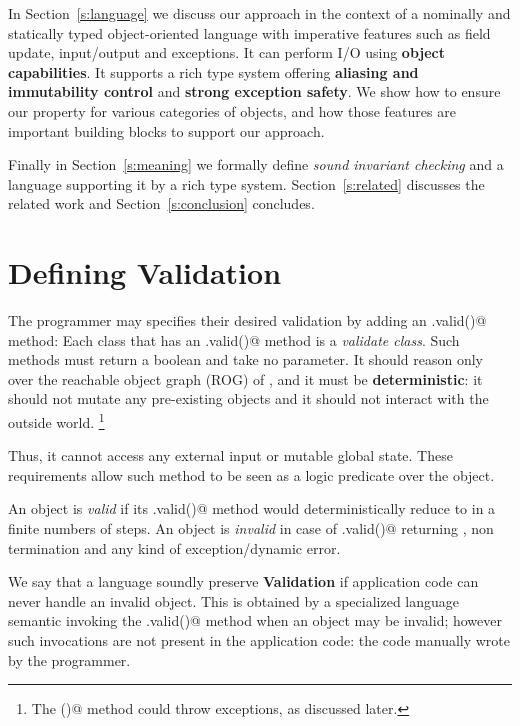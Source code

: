 

In Section~\ref{s:language} we discuss our approach in the context of
a nominally and statically typed object-oriented language with
imperative features such as field update, input/output and exceptions.
It can perform I/O using  \textbf{object capabilities}.
It supports a rich type system offering \textbf{aliasing and immutability control} and \textbf{strong exception safety}.
We show how to ensure our property for various categories of objects, and 
how those features are important building blocks to support our approach.

Finally in Section~\ref{s:meaning} we formally define \emph{sound invariant checking} and
a language supporting it by a rich type system.
 Section~\ref{s:related} discusses the related work and Section~\ref{s:conclusion} concludes.



\saveSpace\saveSpace
\section{Defining Validation}
\label{s:def}
\saveSpace
The programmer may specifies their desired validation by adding an \Q@.valid()@ method:
Each class that has an \Q@.valid()@ method is a
\emph{validate class}.
Such \Q@valid@ methods must return a boolean and take no parameter.
It should reason only over the reachable object graph (ROG) of \Q@this@, and
it must be \textbf{deterministic}:
it should not mutate any pre-existing objects and it should not interact with the outside world.%
\footnote{The \Q@valid()@ method could throw exceptions, as discussed later.}

Thus, it cannot access any external input or mutable global state.
These requirements allow such method to be seen as a logic predicate over the object.

An object is \textit{valid} if its \Q@.valid()@ method
would deterministically reduce to \Q@true@ in a finite numbers of steps.
An object is \textit{invalid} in case of \Q@.valid()@ returning \Q@false@,
non termination and any kind of exception/dynamic error.

We say that a language soundly preserve \textbf{Validation} if
application code can never handle an invalid object.
This is obtained by a specialized language semantic invoking the \Q@.valid()@
method when an object may be invalid; however such invocations are not present in
the application code: the code manually wrote by the programmer.

